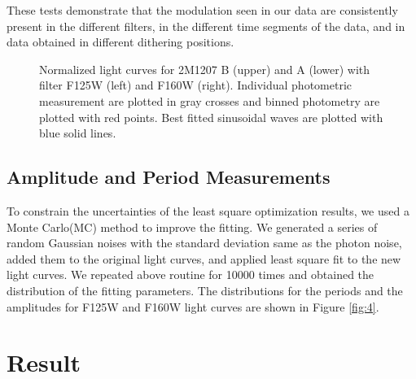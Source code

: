\documentclass[apj]{emulateapj}
\begin{document}
 These tests demonstrate that the modulation seen in our data are
 consistently present in the different filters, in the different time
 segments of the data, and in data obtained in different dithering
 positions.
 




  \begin{figure*}
  \centering
  \caption{Normalized light curves for 2M1207 B (upper) and A (lower)
    with filter F125W (left) and F160W (right). Individual photometric
  measurement are plotted in gray crosses and binned photometry are
  plotted with red points. Best fitted sinusoidal waves are plotted
  with blue solid lines.}
  \label{fig:3}
\end{figure*}

\subsection{Amplitude and Period Measurements}

To constrain the uncertainties of the least square optimization
results, we used a Monte Carlo(MC) method to improve the fitting. We
generated a series of random Gaussian noises with the standard deviation same as
the photon noise, added them to the original light curves, and applied
least square fit to the new light curves. We repeated above routine for 10000 times and obtained
the distribution of the fitting parameters. The distributions for the
periods and the amplitudes for F125W and F160W light curves are
shown in Figure \ref{fig:4}.


\section{Result}
\end{document}
